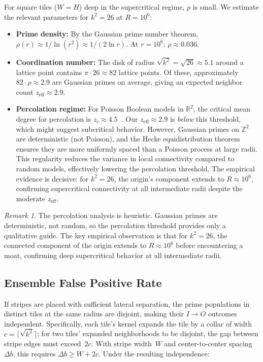 \documentclass[11pt,a4paper]{article}
\theoremstyle{definition}
\theoremstyle{remark}
\newtheorem{remark}[theorem]{Remark}
\newcommand{\IO}{I{\to}O}
\begin{document}
For square tiles ($W = H$) deep in the supercritical regime, $p$ is
small.  We estimate the relevant parameters for $k^2 = 26$ at
$R = 10^6$:

\begin{itemize}
  \item \textbf{Prime density:} By the Gaussian prime number theorem,
    $\rho(r) \approx 1 / \!\ln(r^2) \approx 1/(2\ln r)$.
    At $r = 10^6$: $\rho \approx 0.036$.
  \item \textbf{Coordination number:} The disk of radius
    $\sqrt{k^2} = \sqrt{26} \approx 5.1$ around a lattice point
    contains $\pi \cdot 26 \approx 82$ lattice points.  Of these,
    approximately $82 \cdot \rho \approx 2.9$ are Gaussian primes
    on average, giving an expected neighbor count
    $z_{\mathrm{eff}} \approx 2.9$.
  \item \textbf{Percolation regime:} For Poisson Boolean models in
    $\mathbb{R}^2$, the critical mean degree for percolation is
    $z_c \approx 4.5$~\cite{meester1996}.  Our
    $z_{\mathrm{eff}} \approx 2.9$ is \emph{below} this threshold,
    which might suggest subcritical behavior.  However, Gaussian
    primes on $\mathbb{Z}^2$ are deterministic (not Poisson), and
    the Hecke equidistribution theorem ensures they are more
    uniformly spaced than a Poisson process at large radii.  This
    regularity reduces the variance in local connectivity compared
    to random models, effectively lowering the percolation threshold.
    The empirical evidence is decisive: for $k^2 = 26$, the origin's
    component extends to $R \approx 10^6$, confirming supercritical
    connectivity at all intermediate radii despite the moderate
    $z_{\mathrm{eff}}$.
\end{itemize}

\begin{remark}
The percolation analysis is heuristic.  Gaussian primes are
deterministic, not random, so the percolation threshold provides
only a qualitative guide.  The key empirical observation is that for
$k^2 = 26$, the connected component of the origin extends to
$R \approx 10^6$ before encountering a moat, confirming deep
supercritical behavior at all intermediate radii.
\end{remark}

\subsection{Ensemble False Positive Rate}

If stripes are placed with sufficient lateral separation, the prime
populations in distinct tiles at the same radius are disjoint, making
their $\IO$ outcomes independent.  Specifically, each tile's kernel
expands the tile by a collar of width $c = \lceil\sqrt{k^2}\rceil$;
for two tiles' expanded neighborhoods to be disjoint, the gap between
stripe edges must exceed~$2c$.  With stripe width~$W$ and center-to-center
spacing~$\Delta b$, this requires $\Delta b \ge W + 2c$.
Under the resulting independence:
\end{document}
